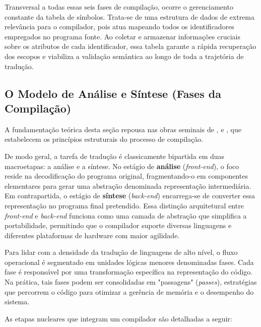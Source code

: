 Transversal a todas essas seis fases de compilação, ocorre o gerenciamento constante da tabela de símbolos. Trata-se de uma estrutura de dados de extrema relevância para o compilador, pois atua mapeando todos os identificadores empregados no programa fonte. Ao coletar e armazenar informações cruciais sobre os atributos de cada identificador, essa tabela garante a rápida recuperação dos escopos e viabiliza a validação semântica ao longo de toda a trajetória de tradução.

\subsection{O Modelo de Análise e Síntese (Fases da Compilação)}

A fundamentação teórica desta seção repousa nas obras seminais de ,  e , que estabelecem os princípios estruturais do processo de compilação.

De modo geral, a tarefa de tradução é classicamente bipartida em duas macroetapas: a análise e a síntese. 
No estágio de \textbf{análise} (\textit{front-end}), o foco reside na decodificação do programa original, fragmentando-o em componentes elementares para gerar uma abstração denominada representação intermediária. 
Em contrapartida, o estágio de \textbf{síntese} (\textit{back-end}) encarrega-se de converter essa representação no programa final pretendido. 
Essa distinção arquitetural entre \textit{front-end} e \textit{back-end} funciona como uma camada de abstração que simplifica a portabilidade, permitindo que o compilador suporte diversas linguagens e diferentes plataformas de hardware com maior agilidade.

Para lidar com a densidade da tradução de linguagens de alto nível, o fluxo operacional é segmentado em unidades lógicas menores denominadas fases. Cada fase é responsável por uma transformação específica na representação do código. Na prática, tais fases podem ser consolidadas em "passagens" (\textit{passes}), estratégias que percorrem o código para otimizar a gerência de memória e o desempenho do sistema.

As etapas nucleares que integram um compilador são detalhadas a seguir:

